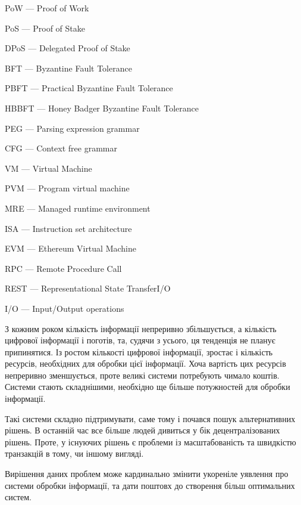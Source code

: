 \documentclass{lib/styles/default-style}
\begin{document}
\pagestyle{default-numbered}

\tableofcontents

\newpage


    PoW --- Proof of Work

    PoS --- Proof of Stake

    DPoS --- Delegated Proof of Stake

    BFT --- Byzantine Fault Tolerance
    
    PBFT --- Practical Byzantine Fault Tolerance
    
    HBBFT --- Honey Badger Byzantine Fault Tolerance
    
    PEG --- Parsing expression grammar
    
    CFG --- Context free grammar
    
    VM --- Virtual Machine
    
    PVM --- Program virtual machine
    
    MRE --- Managed runtime environment
    
    ISA --- Instruction set architecture

    EVM --- Ethereum Virtual Machine

    RPC --- Remote Procedure Call

    REST --- Representational State TransferI/O

    I/O --- Input/Output operations

\newpage


    З кожним роком кількість інформації непреривно збільшується, а кількість цифрової інформації і поготів,
    та, судячи з усього, ця тенденція не планує припинятися. Із ростом кількості цифрової інформації, зростає і
    кількість ресурсів, необхідних для обробки цієї інформації. Хоча вартість цих ресурсів непреривно зменшується,
    проте великі системи потребують чимало коштів. Системи стають складнішими, необхідно ще більше потужностей для обробки інформації.

    Такі системи складно підтримувати, саме тому і почався пошук альтернативних рішень. В останній час все більше людей дивиться у бік
    децентралізованих рішень. Проте, у існуючих рішень є проблеми із масштабованість та швидкістю транзакцій в тому, чи іншому вигляді.

    Вирішення даних проблем може кардинально змінити укореніле уявлення про системи обробки інформації, та дати поштовх до створення
    більш оптимальних систем.
\end{document}

